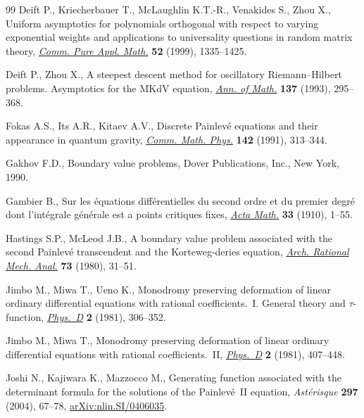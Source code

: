 \begin{thebibliography}{99}
Deift P., Kriecherbauer T., McLaughlin K.T.-R., Venakides S., Zhou X., Uniform
 asymptotics for polynomials orthogonal with respect to varying exponential
 weights and applications to universality questions in random matrix theory,
 \href{https://doi.org/10.1002/(SICI)1097-0312(199911)52:11<1335::AID-CPA1>3.0.CO;2-1}{\textit{Comm.
 Pure Appl. Math.}} \textbf{52} (1999), 1335--1425.

Deift P., Zhou X., A steepest descent method for oscillatory
 {R}iemann--{H}ilbert problems. {A}symptotics for the {MK}d{V} equation,
 \href{https://doi.org/10.2307/2946540}{\textit{Ann. of Math.}} \textbf{137}
 (1993), 295--368.

Fokas A.S., Its A.R., Kitaev A.V., Discrete {P}ainlev\'e equations and their
 appearance in quantum gravity,
 \href{https://doi.org/10.1007/BF02102066}{\textit{Comm. Math. Phys.}}
 \textbf{142} (1991), 313--344.

Gakhov F.D., Boundary value problems, Dover Publications, Inc., New York, 1990.

Gambier B., Sur les \'equations diff\'erentielles du second ordre et du premier
 degr\'e dont l'int\'egrale g\'en\'erale est a points critiques fixes,
 \href{https://doi.org/10.1007/BF02393211}{\textit{Acta Math.}} \textbf{33}
 (1910), 1--55.

Hastings S.P., McLeod J.B., A boundary value problem associated with the second
 {P}ainlev\'e transcendent and the {K}orteweg-deries equation,
 \href{https://doi.org/10.1007/BF00283254}{\textit{Arch. Rational Mech.
 Anal.}} \textbf{73} (1980), 31--51.

Jimbo M., Miwa T., Ueno K., Monodromy preserving deformation of linear ordinary
 differential equations with rational coefficients.~{I}. {G}eneral theory and
 {$\tau $}-function,
 \href{https://doi.org/10.1016/0167-2789(81)90013-0}{\textit{Phys.~D}}
 \textbf{2} (1981), 306--352.

Jimbo M., Miwa T., Monodromy preserving deformation of linear ordinary
 differential equations with rational coefficients.~{II},
 \href{https://doi.org/10.1016/0167-2789(81)90021-X}{\textit{Phys.~D}}
 \textbf{2} (1981), 407--448.

Joshi N., Kajiwara K., Mazzocco M., Generating function associated with the
 determinant formula for the solutions of the {P}ainlev\'e~{II} equation,
 \textit{Ast\'erisque} \textbf{297} (2004), 67--78,
 \href{http://arxiv.org/abs/nlin.SI/0406035}{arXiv:nlin.SI/0406035}.


\end{thebibliography}
